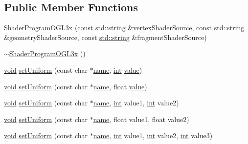 \subsection*{Public Member Functions}
\begin{DoxyCompactItemize}
\item 
\hyperlink{class_a_c_t_k_1_1_shader_program_o_g_l3x_a941df7ef4773ebdcde738c0ba7a605f2}{Shader\-Program\-O\-G\-L3x} (const \hyperlink{glew_8h_ae9ea2d206f76ea82db7a2ea002fdef2f}{std\-::string} \&vertex\-Shader\-Source, const \hyperlink{glew_8h_ae9ea2d206f76ea82db7a2ea002fdef2f}{std\-::string} \&geometry\-Shader\-Source, const \hyperlink{glew_8h_ae9ea2d206f76ea82db7a2ea002fdef2f}{std\-::string} \&fragment\-Shader\-Source)
\item 
\hyperlink{class_a_c_t_k_1_1_shader_program_o_g_l3x_a2e04534a5f7dd60e0c4a6d55fe13d33f}{$\sim$\-Shader\-Program\-O\-G\-L3x} ()
\item 
\hyperlink{wglew_8h_aeea6e3dfae3acf232096f57d2d57f084}{void} \hyperlink{class_a_c_t_k_1_1_shader_program_o_g_l3x_ab38db2f92e57dd91b31561a2b37af01c}{set\-Uniform} (const char $\ast$\hyperlink{glew_8h_a5c4947d4516dd7cfa3505ce3a648a4ef}{name}, \hyperlink{wglew_8h_a500a82aecba06f4550f6849b8099ca21}{int} \hyperlink{glew_8h_a6a4f8a1a444e9080b297963b3db29fe0}{value})
\item 
\hyperlink{wglew_8h_aeea6e3dfae3acf232096f57d2d57f084}{void} \hyperlink{class_a_c_t_k_1_1_shader_program_o_g_l3x_ae3c6fd3eccd28e72f86f08bd03b62312}{set\-Uniform} (const char $\ast$\hyperlink{glew_8h_a5c4947d4516dd7cfa3505ce3a648a4ef}{name}, float \hyperlink{glew_8h_a6a4f8a1a444e9080b297963b3db29fe0}{value})
\item 
\hyperlink{wglew_8h_aeea6e3dfae3acf232096f57d2d57f084}{void} \hyperlink{class_a_c_t_k_1_1_shader_program_o_g_l3x_a43462e70bf2eb0ccce053b4fc9e70add}{set\-Uniform} (const char $\ast$\hyperlink{glew_8h_a5c4947d4516dd7cfa3505ce3a648a4ef}{name}, \hyperlink{wglew_8h_a500a82aecba06f4550f6849b8099ca21}{int} value1, \hyperlink{wglew_8h_a500a82aecba06f4550f6849b8099ca21}{int} value2)
\item 
\hyperlink{wglew_8h_aeea6e3dfae3acf232096f57d2d57f084}{void} \hyperlink{class_a_c_t_k_1_1_shader_program_o_g_l3x_aac8acc29fcfbcb4c2c4608e3a22a0c87}{set\-Uniform} (const char $\ast$\hyperlink{glew_8h_a5c4947d4516dd7cfa3505ce3a648a4ef}{name}, float value1, float value2)
\item 
\hyperlink{wglew_8h_aeea6e3dfae3acf232096f57d2d57f084}{void} \hyperlink{class_a_c_t_k_1_1_shader_program_o_g_l3x_a9f318ad4fc15b9584977be2a43e3ae80}{set\-Uniform} (const char $\ast$\hyperlink{glew_8h_a5c4947d4516dd7cfa3505ce3a648a4ef}{name}, \hyperlink{wglew_8h_a500a82aecba06f4550f6849b8099ca21}{int} value1, \hyperlink{wglew_8h_a500a82aecba06f4550f6849b8099ca21}{int} value2, \hyperlink{wglew_8h_a500a82aecba06f4550f6849b8099ca21}{int} value3)

\end{DoxyCompactItemize}
